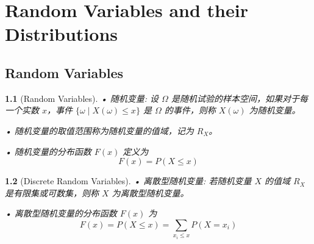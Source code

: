\documentclass[UTF8]{report}
\theoremstyle{MyLineTheoremStyle} %
\theoremstyle{MyBlockTheoremStyle} %
\theoremstyle{MySubsubsectionStyle} %
\newtheorem{definition}{}
\begin{document}
%    



\chapter{Random Variables and their Distributions}\thispagestyle{fancy} 
\section{Random Variables}
\begin{definition}[Random Variables]
    • 随机变量: 设 \(\Omega\) 是随机试验的样本空间，如果对于每一个实数 \(x\)，事件 \(\{ \omega \mid X(\omega) \leq x \}\) 是 \(\Omega\) 的事件，则称 \(X(\omega)\) 为随机变量。\par
    • 随机变量的取值范围称为随机变量的值域，记为 \(R_X\)。\par
    • 随机变量的分布函数 \(F(x)\) 定义为
    \[
    F(x) = P(X \leq x)
    \]
\end{definition}

\begin{definition}[Discrete Random Variables]
    • 离散型随机变量: 若随机变量 \(X\) 的值域 \(R_X\) 是有限集或可数集，则称 \(X\) 为离散型随机变量。\par
    • 离散型随机变量的分布函数 \(F(x)\) 为
    \[
    F(x) = P(X \leq x) = \sum_{x_i \leq x} P(X = x_i)
    \]
\end{definition}
\end{document}
